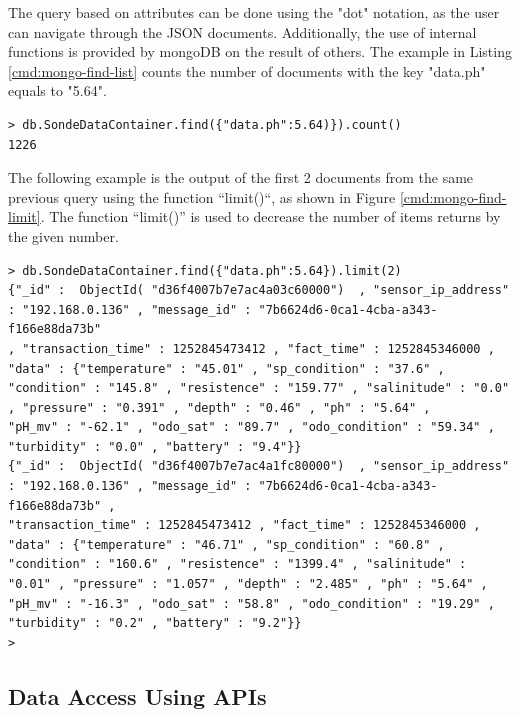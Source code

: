 The query based on attributes can be done using the "dot" notation, as the user
can navigate through the JSON documents. Additionally, the use of internal
functions is provided by mongoDB on the result of others. The example in
Listing \ref{cmd:mongo-find-list} counts the number of documents with the key
"data.ph" equals to "5.64".

\lstset{label=cmd:mongo-find-list,caption=Execution of mongo client}
\begin{lstlisting}
> db.SondeDataContainer.find({"data.ph":5.64)}).count()
1226
\end{lstlisting}

The following example is the output of the first 2 documents from the same
previous query using the function ``limit()``, as shown in Figure
\ref{cmd:mongo-find-limit}. The function ``limit()'' is used to decrease the
number of items returns by the given number.

\lstset{label=cmd:mongo-find-limit,caption=Query Element with specific
projection limiting the result set size}
\begin{lstlisting}
> db.SondeDataContainer.find({"data.ph":5.64}).limit(2)
{"_id" :  ObjectId( "d36f4007b7e7ac4a03c60000")  , "sensor_ip_address" : "192.168.0.136" , "message_id" : "7b6624d6-0ca1-4cba-a343-f166e88da73b"
, "transaction_time" : 1252845473412 , "fact_time" : 1252845346000 , "data" : {"temperature" : "45.01" , "sp_condition" : "37.6" ,
"condition" : "145.8" , "resistence" : "159.77" , "salinitude" : "0.0" , "pressure" : "0.391" , "depth" : "0.46" , "ph" : "5.64" ,
"pH_mv" : "-62.1" , "odo_sat" : "89.7" , "odo_condition" : "59.34" , "turbidity" : "0.0" , "battery" : "9.4"}}
{"_id" :  ObjectId( "d36f4007b7e7ac4a1fc80000")  , "sensor_ip_address" : "192.168.0.136" , "message_id" : "7b6624d6-0ca1-4cba-a343-f166e88da73b" ,
"transaction_time" : 1252845473412 , "fact_time" : 1252845346000 , "data" : {"temperature" : "46.71" , "sp_condition" : "60.8" ,
"condition" : "160.6" , "resistence" : "1399.4" , "salinitude" : "0.01" , "pressure" : "1.057" , "depth" : "2.485" , "ph" : "5.64" ,
"pH_mv" : "-16.3" , "odo_sat" : "58.8" , "odo_condition" : "19.29" , "turbidity" : "0.2" , "battery" : "9.2"}}
>
\end{lstlisting}

\subsection{Data Access Using APIs}
\label{sec:dsp-mongodb-rest-ws}

